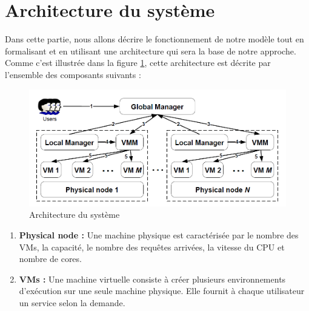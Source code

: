 \section{Architecture du système}
\begin{onehalfspace}
Dans cette partie, nous allons décrire le fonctionnement de notre modèle tout en formalisant et en utilisant une architecture qui sera la base de notre approche. Comme c’est illustrée dans la figure \ref{Architecture du système}, cette architecture est décrite par l’ensemble des composants suivants :
\clearpage
\begin{figure}[!h]
\begin{center}
\includegraphics[scale=0.43]{figures/4.png} 
\end{center}
\caption{Architecture du système}
\label{Architecture du système}
\end{figure}
\begin{enumerate} [label=\Roman*)]
\item \textbf{Physical node :} Une machine physique est caractérisée par le nombre des VMs, la capacité, le nombre des requêtes arrivées, la vitesse du CPU et nombre de cores.
\item \textbf{VMs :}  Une machine virtuelle consiste à créer plusieurs environnements d'exécution sur une seule machine physique. Elle fournit à chaque utilisateur un service selon la demande.

\end{enumerate}
\end{onehalfspace}
